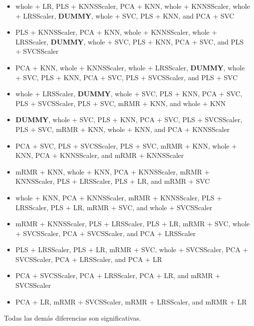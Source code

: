 \documentclass[a4paper,oneside,11pt,leqno]{article}
\begin{document}
	\begin{itemize}
		\item whole + LR, PLS + KNNSScaler, PCA + KNN, whole + KNNSScaler, whole + LRSScaler,  \textbf{DUMMY}, whole + SVC, PLS + KNN, and PCA + SVC
		
		\item PLS + KNNSScaler, PCA + KNN, whole + KNNSScaler, whole + LRSScaler,  \textbf{DUMMY}, whole + SVC, PLS + KNN, PCA + SVC, and PLS + SVCSScaler
		
		\item PCA + KNN, whole + KNNSScaler, whole + LRSScaler,  \textbf{DUMMY}, whole + SVC, PLS + KNN, PCA + SVC, PLS + SVCSScaler, and PLS + SVC
		
		\item whole + LRSScaler,  \textbf{DUMMY}, whole + SVC, PLS + KNN, PCA + SVC, PLS + SVCSScaler, PLS + SVC, mRMR + KNN, and whole + KNN
		
		\item  \textbf{DUMMY}, whole + SVC, PLS + KNN, PCA + SVC, PLS + SVCSScaler, PLS + SVC, mRMR + KNN, whole + KNN, and PCA + KNNSScaler
		
		\item PCA + SVC, PLS + SVCSScaler, PLS + SVC, mRMR + KNN, whole + KNN, PCA + KNNSScaler, and mRMR + KNNSScaler
		
		\item mRMR + KNN, whole + KNN, PCA + KNNSScaler, mRMR + KNNSScaler, PLS + LRSScaler, PLS + LR, and mRMR + SVC
		
		\item whole + KNN, PCA + KNNSScaler, mRMR + KNNSScaler, PLS + LRSScaler, PLS + LR, mRMR + SVC, and whole + SVCSScaler
		
		\item mRMR + KNNSScaler, PLS + LRSScaler, PLS + LR, mRMR + SVC, whole + SVCSScaler, PCA + SVCSScaler, and PCA + LRSScaler
		
		\item PLS + LRSScaler, PLS + LR, mRMR + SVC, whole + SVCSScaler, PCA + SVCSScaler, PCA + LRSScaler, and PCA + LR
		
		\item PCA + SVCSScaler, PCA + LRSScaler, PCA + LR, and mRMR + SVCSScaler
		
		\item PCA + LR, mRMR + SVCSScaler, mRMR + LRSScaler, and mRMR + LR
	\end{itemize}
	
	Todas las demás diferencias son significativas.
	
\end{document}
